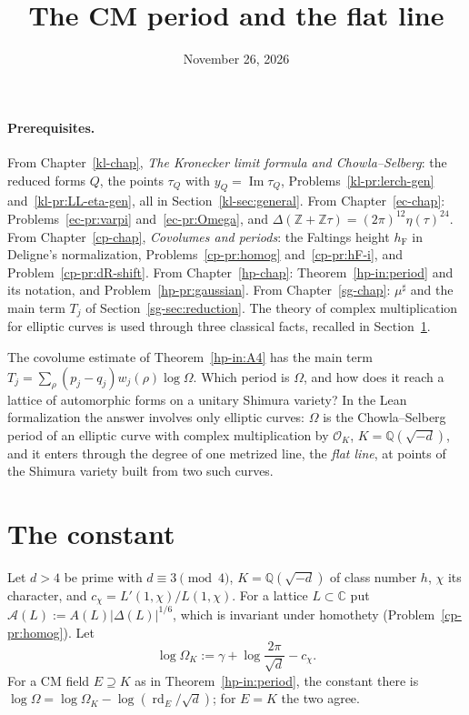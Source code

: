 \documentclass[reqno]{amsart}
\title{The CM period and the flat line}
\author{}
\date{November 26, 2026}
\newcounter{chap}
\theoremstyle{definition}
\theoremstyle{plain}
\theoremstyle{remark}
\newcommand{\Z}{\mathbb Z}
\newcommand{\Q}{\mathbb Q}
\newcommand{\C}{\mathbb C}
\newcommand{\Oc}{\mathcal O}
\newcommand{\Ac}{\mathcal A}
\newcommand{\rd}{\operatorname{rd}}
\newcommand{\mus}{\mu^\sharp}
\newcommand{\hF}{h_{\mathrm F}}
\begin{document}
\maketitle
{}\label{chap}

\paragraph{Prerequisites.}
From Chapter~\ref{kl-chap}, \emph{The Kronecker limit formula and Chowla--Selberg}: the reduced forms \(Q\), the points \(\tau_Q\) with \(y_Q = \operatorname{Im}\tau_Q\), Problems~\ref{kl-pr:lerch-gen} and~\ref{kl-pr:LL-eta-gen}, all in Section~\ref{kl-sec:general}.  From Chapter~\ref{ec-chap}: Problems~\ref{ec-pr:varpi} and~\ref{ec-pr:Omega}, and \(\Delta(\Z + \Z\tau) = (2\pi)^{12}\eta(\tau)^{24}\).  From Chapter~\ref{cp-chap}, \emph{Covolumes and periods}: the Faltings height \(\hF\) in Deligne's normalization, Problems~\ref{cp-pr:homog} and~\ref{cp-pr:hF-i}, and Problem~\ref{cp-pr:dR-shift}.  From Chapter~\ref{hp-chap}: Theorem~\ref{hp-in:period} and its notation, and Problem~\ref{hp-pr:gaussian}.  From Chapter~\ref{sg-chap}: \(\mus\) and the main term \(T_j\) of Section~\ref{sg-sec:reduction}.  The theory of complex multiplication for elliptic curves is used through three classical facts, recalled in Section~\ref{sec:constant}.

The covolume estimate of Theorem~\ref{hp-in:A4} has the main term \(T_j = \sum_\rho(p_j - q_j)w_j(\rho)\log\Omega\).  Which period is \(\Omega\), and how does it reach a lattice of automorphic forms on a unitary Shimura variety?  In the Lean formalization \cite{Lean} the answer involves only elliptic curves: \(\Omega\) is the Chowla--Selberg period of an elliptic curve with complex multiplication by \(\Oc_K\), \(K = \Q(\sqrt{-d})\), and it enters through the degree of one metrized line, the \emph{flat line}, at points of the Shimura variety built from two such curves.

\section{The constant}\label{sec:constant}

Let \(d > 4\) be prime with \(d \equiv 3 \pmod 4\), \(K = \Q(\sqrt{-d})\) of class number \(h\), \(\chi\) its character, and \(c_\chi = L'(1,\chi)/L(1,\chi)\).  For a lattice \(L \subset \C\) put \(\Ac(L) := A(L)\lvert\Delta(L)\rvert^{1/6}\), which is invariant under homothety (Problem~\ref{cp-pr:homog}).  Let
\[
  \log\Omega_K := \gamma + \log\frac{2\pi}{\sqrt d} - c_\chi .
\]
For a CM field \(E \supseteq K\) as in Theorem~\ref{hp-in:period}, the constant there is \(\log\Omega = \log\Omega_K - \log(\rd_E/\sqrt d)\); for \(E = K\) the two agree.
\end{document}
